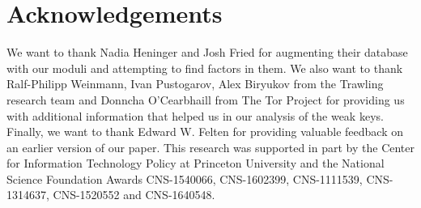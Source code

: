\section*{Acknowledgements}
We want to thank Nadia Heninger and Josh Fried for augmenting their database
with our moduli and attempting to find factors in them. We also want to
thank Ralf-Philipp Weinmann, Ivan Pustogarov, Alex Biryukov from the Trawling
research team and Donncha O'Cearbhaill from The Tor Project for providing us
with additional information that helped us in our analysis of the weak keys.
Finally, we want to thank Edward W. Felten for providing valuable feedback on an
earlier version of our paper.  This research was supported in part by the Center
for Information Technology Policy at Princeton University and the National
Science Foundation Awards CNS-1540066, CNS-1602399, CNS-1111539, CNS-1314637,
CNS-1520552 and CNS-1640548.
